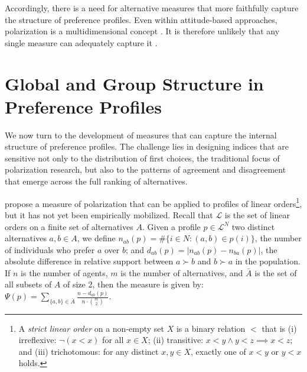 \documentclass[12pt]{article}
\begin{document}
Accordingly, there is a need for alternative measures that more faithfully capture the structure of preference profiles. Even within attitude-based approaches, polarization is a multidimensional concept \parencite{bramson2017understanding, bramson16_disam_social_polar_concep_measur}. It is therefore unlikely that any single measure can adequately capture it \parencite{patty14_analy_big_data}.


\section{Global and Group Structure in Preference Profiles}

We now turn to the development of measures that can capture the internal
structure of preference profiles. The challenge lies in designing indices that
are sensitive not only to the distribution of first choices, the traditional
focus of polarization research, but also to the patterns of agreement and
disagreement that emerge across the full ranking of alternatives.

\textcite{can2015measuring} propose a measure of polarization that can be applied to profiles of linear orders\footnote{A \emph{strict linear order} on a non-empty set \(X\) is a binary relation \(<\) that is (i) {irreflexive}: \(\lnot(x<x)\) for all \(x\in X\); (ii) {transitive}: \(x<y\land y<z\!\implies\! x<z\); and (iii) {trichotomous}: for any distinct \(x,y\in X\), exactly one of \(x<y\) or \(y<x\) holds.  }, but it has not yet been empirically mobilized. Recall that  \( \mathcal{L} \) is the set of linear orders on a finite set of alternatives \( A \). Given a profile \( p \in \mathcal{L}^N \) two distinct alternatives \( a, b \in A \), we define \( n_{ab}(p) = \# \{ i \in N : (a, b) \in p(i) \} \), the number of individuals who prefer \( a \) over \( b \); and  \( d_{ab}(p) = |n_{ab}(p) - n_{ba}(p)| \), the absolute difference in relative support between \( a \succ b \) and \( b \succ a \) in the population. If \( n \) is the number of agents,  \( m \) is the number of alternatives, and \(\bar{A}\) is the set of all subsets of \(A\) of size 2,  then the measure is given by: \(\Psi(p) = \sum_{\{a,b\} \in \bar{A}} \frac{n - d_{ab}(p)}{n \cdot \binom{m}{2}}\).
\end{document}
